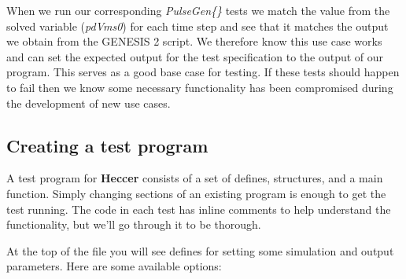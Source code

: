\documentclass[12pt]{article}
\begin{document}
\begin{figure}[ht]
  \centering
\end{figure}

\begin{figure}[ht]
  \centering
\end{figure}

When we run our corresponding {\it PulseGen\{\}} tests we match the value from the solved variable ({\it pdVms0}) for each time step and see that it matches the output we obtain from the GENESIS 2 script. We therefore know this use case works and can set the expected output for the test specification to the output of our program. This serves as a good base case for testing. If these tests should happen to fail then we know some necessary functionality has been compromised during the development of new use cases.

\subsection*{Creating a test program}

A test program for {\bf Heccer} consists of a set of defines, structures, and a main function. Simply changing sections of an existing program is enough to get the test running. The code in each test has inline comments to help understand the functionality, but we'll go through it to be thorough.

At the top of the file you will see defines for setting some simulation and output parameters. Here are some available options:
\end{document}
